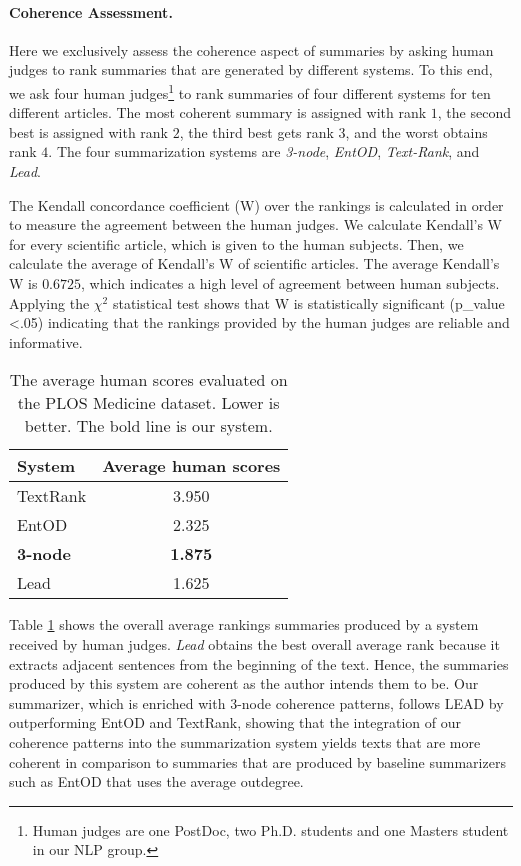 \paragraph{Coherence Assessment.} 
Here we exclusively assess the coherence aspect of summaries by asking human judges to rank summaries that are generated by different systems. 
To this end, we ask four human judges\footnote{Human judges are one PostDoc, two Ph.D. students and one Masters student in our NLP group.} to rank summaries of four different systems for ten different articles. 
The most coherent summary is assigned with rank $1$, the second best is assigned with rank $2$, the third best gets rank $3$, and the worst obtains rank $4$.
The four summarization systems are
\emph{3-node}, \emph{EntOD}, \emph{Text-Rank}, and \emph{Lead}.

The Kendall concordance coefficient (W) \cite{siegel88} over the rankings is calculated in order to measure the agreement between the human judges.  
We calculate Kendall's W for every scientific article, which is given to the human subjects. 
Then, we calculate the average of Kendall's W of scientific articles. 
The average Kendall's W is $0.6725$, which indicates a high level of agreement between human subjects.
Applying the $\chi^2$ statistical test shows that W is statistically significant (p\_value <.05) indicating that the rankings provided by the human judges are reliable and informative.


\begin{table}[!ht]
	\begin{center}
		\begin{tabular}{lc}
		\toprule
		\textbf{System} 				&  \textbf{Average human scores} \\
		\midrule
		TextRank 			& 3.950					\\
		EntOD 				& 2.325					\\
		\textbf{3-node}		& \textbf{1.875} 		\\
		Lead 				& 1.625					\\
		\bottomrule
		\end{tabular}
	\end{center}
	\caption{The average human scores evaluated on the PLOS Medicine dataset. Lower is better. 
	The bold line is our system.}
	\label{tab:summary-human}
\end{table}

Table \ref{tab:summary-human} shows the overall average rankings summaries produced by a system received by human judges. 
\emph{Lead} obtains the best overall average rank because it extracts adjacent sentences from the beginning of the text. 
Hence, the summaries produced by this system are coherent as the author intends them to be. 
Our summarizer, which is enriched with 3-node coherence patterns, follows LEAD by outperforming EntOD and TextRank, showing that the integration of our coherence patterns into the summarization system yields texts that are more coherent in comparison to summaries that are produced by baseline summarizers such as EntOD that uses the average outdegree.  

